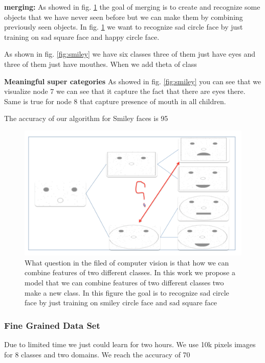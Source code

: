\documentclass[10pt,twocolumn,letterpaper]{article}
\begin{document}
\textbf{merging:} As showed in fig. \ref{merge} the goal of merging is to create and recognize some objects that we have never seen before but we can make them by combining previously seen objects. In fig. \ref{merge} we want to recognize sad circle face by just training on sad square face and happy circle face.

As shown in fig. \ref{fig:smiley} we have six classes three of them just have eyes and three of them just have mouthes. When we add theta of class 
 
\textbf{Meaningful super categories} As showed in fig. \ref{fig:smiley} you can see that we visualize node 7 we can see that it capture the fact that there are eyes there. Same is true for node 8 that capture presence of mouth in all children.

The accuracy of our algorithm for Smiley faces is 95%
   
 \begin{figure}[t]
 	\begin{center}
 		\includegraphics[width=0.8\linewidth]{merge}
 	\end{center}
 	\caption{What question in the filed of computer vision is that how we can combine features of two different classes. In this work we propose a model that we can combine features of two different classes two make a new class. In this figure the goal is to recognize sad circle face by just training on smiley circle face and sad square face}
 	\label{merge}
 \end{figure}
 
 


 \subsubsection{Fine Grained Data Set}
Due to limited time we just could learn for two hours. We use 10k pixels images for 8 classes and two domains. We reach the accuracy of 70%
\end{document}
